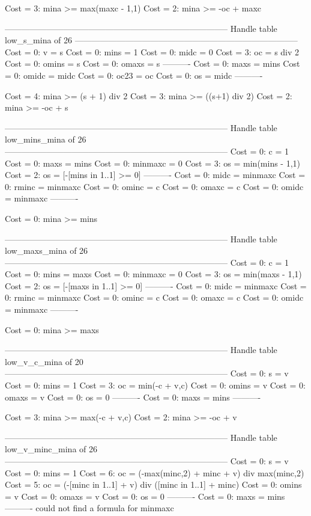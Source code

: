 Cost =  3:  mina >= max(maxc - 1,1)
Cost =  2:  mina >= -oc + maxc

--------------------------------------------------------------------------------
Handle table low_s_mina of 26
--------------------------------------------------------------------------------
Cost =  0:  v     = s
Cost =  0:  mins  = 1
Cost =  0:  midc  = 0
Cost =  3:  oc    = s div 2
Cost =  0:  omins = s
Cost =  0:  omaxs = s
----------
Cost =  0:  maxs  = mins
Cost =  0:  omidc = midc
Cost =  0:  oc23  = oc
Cost =  0:  os    = midc
----------

Cost =  4:  mina >= (s + 1) div 2
Cost =  3:  mina >= ((s+1) div 2)
Cost =  2:  mina >= -oc + s

--------------------------------------------------------------------------------
Handle table low_mins_mina of 26
--------------------------------------------------------------------------------
Cost =  0:  c       = 1
Cost =  0:  maxs    = mins
Cost =  0:  minmaxc = 0
Cost =  3:  os      = min(mins - 1,1)
Cost =  2:  os      = [-[mins in 1..1] >= 0]
----------
Cost =  0:  midc    = minmaxc
Cost =  0:  rminc   = minmaxc
Cost =  0:  ominc   = c
Cost =  0:  omaxc   = c
Cost =  0:  omidc   = minmaxc
----------

Cost =  0:  mina >= mins

--------------------------------------------------------------------------------
Handle table low_maxs_mina of 26
--------------------------------------------------------------------------------
Cost =  0:  c       = 1
Cost =  0:  mins    = maxs
Cost =  0:  minmaxc = 0
Cost =  3:  os      = min(maxs - 1,1)
Cost =  2:  os      = [-[maxs in 1..1] >= 0]
----------
Cost =  0:  midc    = minmaxc
Cost =  0:  rminc   = minmaxc
Cost =  0:  ominc   = c
Cost =  0:  omaxc   = c
Cost =  0:  omidc   = minmaxc
----------

Cost =  0:  mina >= maxs

--------------------------------------------------------------------------------
Handle table low_v_c_mina of 20
--------------------------------------------------------------------------------
Cost =  0:  s     = v
Cost =  0:  mins  = 1
Cost =  3:  oc    = min(-c + v,c)
Cost =  0:  omins = v
Cost =  0:  omaxs = v
Cost =  0:  os    = 0
----------
Cost =  0:  maxs  = mins
----------

Cost =  3:  mina >= max(-c + v,c)
Cost =  2:  mina >= -oc + v

--------------------------------------------------------------------------------
Handle table low_v_minc_mina of 26
--------------------------------------------------------------------------------
Cost =  0:  s       = v
Cost =  0:  mins    = 1
Cost =  6:  oc      = (-max(minc,2) + minc + v) div max(minc,2)
Cost =  5:  oc      = (-[minc in 1..1] + v) div ([minc in 1..1] + minc)
Cost =  0:  omins   = v
Cost =  0:  omaxs   = v
Cost =  0:  os      = 0
----------
Cost =  0:  maxs    = mins
----------
could not find a formula for minmaxc

